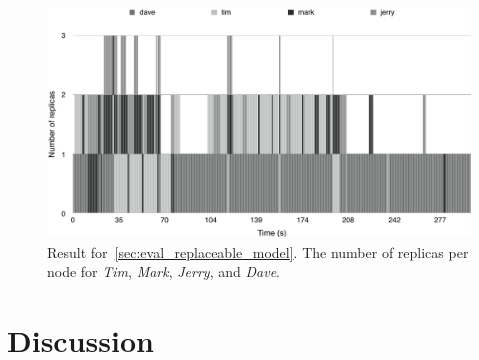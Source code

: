 \documentclass{cslthse-msc}
\begin{document}
\begin{figure}[!hbt]
\centering
\includegraphics[scale=0.5]{images/results/loads/unloaded.pdf}
\caption[Number of replicas in~\cref{sec:eval_replaceable_model}, all nodes but \emph{Kevin}]{Result for~\cref{sec:eval_replaceable_model}. The number of replicas per node for \emph{Tim}, \emph{Mark}, \emph{Jerry}, and \emph{Dave}.} \label{fig:eval_replaceable_model_unloaded}
\end{figure}

\chapter{Discussion} \label{ch:discussion}

\end{document}
